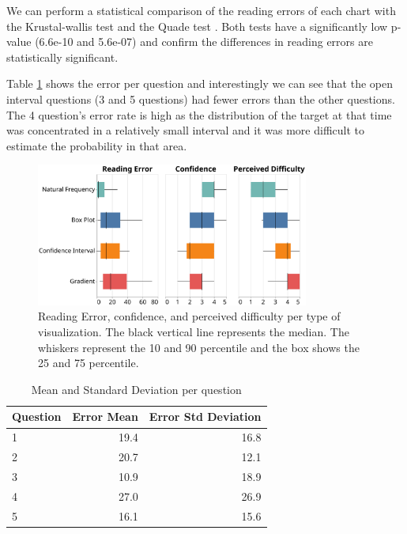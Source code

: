 \documentclass[a4paper,3p,sort&compress]{elsarticle}
\begin{document}
We can perform a statistical comparison of the reading errors of each chart with the Krustal-wallis test \cite{krustal} and
the Quade test \cite{quade_rank_1967}. Both tests have a
significantly low p-value (6.6e-10 and 5.6e-07) and confirm the differences in reading errors are statistically significant.

Table \ref{table:resultsperquestion} shows the error per question and interestingly we can see that the open interval questions (3 and 5 questions)
had fewer errors than the other questions. The 4 question's error rate is high as the distribution of the target
at that time was concentrated in a relatively
small interval and it was more difficult to estimate the probability in that area.

\begin{figure}
  \centering
  \includegraphics[width=0.8\textwidth]{comparison}
  \caption{\label{figure:errors}Reading Error, confidence, and perceived difficulty per
  type of visualization. The black vertical line represents the median.
  The whiskers represent the 10 and 90 percentile and the box shows the 25 and
  75 percentile.}
\end{figure}


\begin{table}[h!]
  \centering
  \begin{tabular}{lrr}
    \toprule
    {}Question &     Error Mean &        Error Std Deviation \\
    \midrule
    1 &  19.4 &  16.8 \\
    2 &  20.7 &  12.1 \\
    3 &  10.9 &  18.9 \\
    4 &  27.0 &  26.9 \\
    5 &  16.1 &  15.6 \\
    \bottomrule
    \end{tabular}
  \caption{Mean and Standard Deviation per question}
  \label{table:resultsperquestion}
  \end{table}
\end{document}
